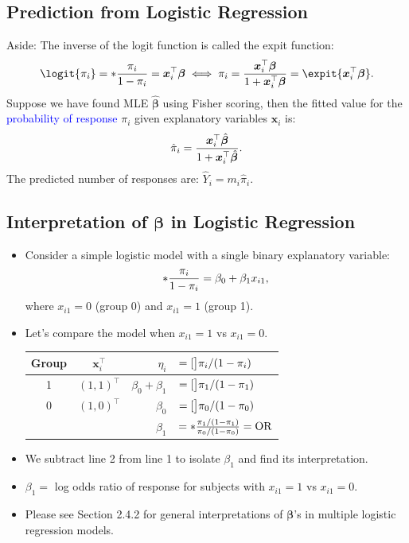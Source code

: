 \documentclass{article}\usepackage[]{graphicx}\usepackage[svgnames]{xcolor}
\let\exp\relax%
\let\log\relax%
\newcommand{\OR}{\text{OR}}%
\providecommand{\Vector}[1]{\bm{#1}}%
\begin{document}
\subsection*{Prediction from Logistic Regression}
Aside: The inverse of the logit function is called the expit function:
\[ \logit{\pi_i}=\log*{\frac{\pi_i}{1-\pi_i}}=\Vector{x}_i^\top \Vector{\beta}\iff \pi_i=\frac{\exp{\Vector{x}_i^\top \Vector{\beta}}}{1+\exp{\Vector{x}_i^\top \Vector{\beta}}}=\expit{\Vector{x}_i^\top \Vector{\beta}}.  \]
Suppose we have found MLE $ \hat{\Vector{\beta}} $ using Fisher scoring, then the fitted value for the \textcolor{Blue}{probability of response} $ \pi_i $ given explanatory
variables $ \Vector{x}_i $ is:
\[ \hat{\pi}_i=\frac{\exp{\Vector{x}_i^\top \hat{\Vector{\beta}}}}{1+\exp{\Vector{x}_i^\top \hat{\Vector{\beta}}}}. \]
The predicted number of responses are: $ \hat{Y}_i=m_i\hat{\pi}_i $.

\subsection*{Interpretation of $ \Vector{\beta} $ in Logistic Regression}
\begin{itemize}
      \item Consider a simple logistic model with a single binary explanatory variable:
            \[ \log*{\frac{\pi_i}{1-\pi_i}}=\beta_0+\beta_1x_{i1}, \]
            where $ x_{i1}=0 $ (group 0) and $ x_{i1}=1 $ (group 1).
      \item Let's compare the model when $ x_{i1}=1 $ vs $ x_{i1}=0 $.
            \begin{table}[!htbp]
                  \centering
                  \begin{tabular}{ccrl}
                        Group & $ \Vector{x}_i^\top $ & $ \eta_i $          & $ =\log[\big]{\pi_i/(1-\pi_i)} $                              \\
                        \midrule
                        1     & $ (1,1)^\top $        & $ \beta_0+\beta_1 $ & $ =\log[\big]{\pi_1/(1-\pi_1)} $                              \\
                        0     & $ (1,0)^\top $        & $ \beta_0 $         & $ =\log[\big]{\pi_0/(1-\pi_0)} $                              \\
                        \midrule
                              &                       & $ \beta_1 $         & $ =\log*{\frac{\pi_1/(1-\pi_1)}{\pi_0/(1-\pi_0)}}=\log{\OR} $
                  \end{tabular}
            \end{table}
      \item We subtract line 2 from line 1 to isolate $ \beta_1 $ and find its interpretation.
      \item $ \beta_1= $ log odds ratio of response for subjects with $ x_{i1}=1 $ vs $ x_{i1}=0 $.
      \item Please see Section 2.4.2 for general interpretations of $ \Vector{\beta} $'s in multiple logistic regression models.
\end{itemize}
\end{document}
